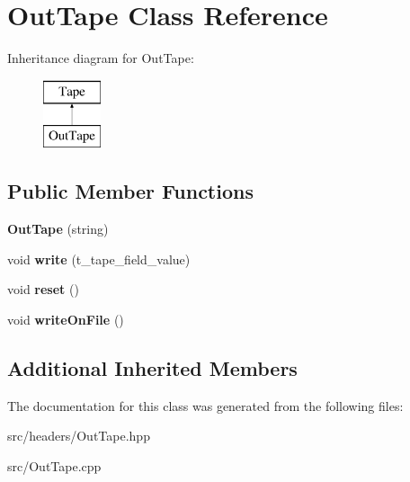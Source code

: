 \hypertarget{classOutTape}{\section{Out\-Tape Class Reference}
\label{classOutTape}
}
Inheritance diagram for Out\-Tape\-:\begin{figure}[H]
\begin{center}
\leavevmode
\includegraphics[height=2.000000cm]{classOutTape}
\end{center}
\end{figure}
\subsection*{Public Member Functions}
\begin{DoxyCompactItemize}
\item 
\hypertarget{classOutTape_aa2bcb3f0d40f7d9a0c562da036b89f34}{{\bfseries Out\-Tape} (string)}\label{classOutTape_aa2bcb3f0d40f7d9a0c562da036b89f34}

\item 
\hypertarget{classOutTape_ac88246c501c7725504842521a1e1aa79}{void {\bfseries write} (t\-\_\-tape\-\_\-field\-\_\-value)}\label{classOutTape_ac88246c501c7725504842521a1e1aa79}

\item 
\hypertarget{classOutTape_a7b217ae81e2caf28d9bad4b3ce3df8de}{void {\bfseries reset} ()}\label{classOutTape_a7b217ae81e2caf28d9bad4b3ce3df8de}

\item 
\hypertarget{classOutTape_a169b25fcd07a5abb4336940ff5d789fb}{void {\bfseries write\-On\-File} ()}\label{classOutTape_a169b25fcd07a5abb4336940ff5d789fb}

\end{DoxyCompactItemize}
\subsection*{Additional Inherited Members}


The documentation for this class was generated from the following files\-:\begin{DoxyCompactItemize}
\item 
src/headers/Out\-Tape.\-hpp\item 
src/Out\-Tape.\-cpp\end{DoxyCompactItemize}
